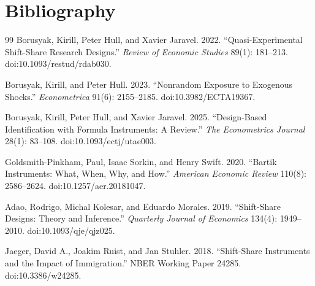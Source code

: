 \documentclass[11pt]{article}
\theoremstyle{definition}
\theoremstyle{plain}
\theoremstyle{remark}
\begin{document}
\section*{Bibliography}
\begin{thebibliography}{99}
Borusyak, Kirill, Peter Hull, and Xavier Jaravel. 2022.
``Quasi-Experimental Shift-Share Research Designs.''
\emph{Review of Economic Studies} 89(1): 181--213.
doi:10.1093/restud/rdab030.

Borusyak, Kirill, and Peter Hull. 2023.
``Nonrandom Exposure to Exogenous Shocks.''
\emph{Econometrica} 91(6): 2155--2185.
doi:10.3982/ECTA19367.

Borusyak, Kirill, Peter Hull, and Xavier Jaravel. 2025.
``Design-Based Identification with Formula Instruments: A Review.''
\emph{The Econometrics Journal} 28(1): 83--108.
doi:10.1093/ectj/utae003.

Goldsmith-Pinkham, Paul, Isaac Sorkin, and Henry Swift. 2020.
``Bartik Instruments: What, When, Why, and How.''
\emph{American Economic Review} 110(8): 2586--2624.
doi:10.1257/aer.20181047.

Adao, Rodrigo, Michal Kolesar, and Eduardo Morales. 2019.
``Shift-Share Designs: Theory and Inference.''
\emph{Quarterly Journal of Economics} 134(4): 1949--2010.
doi:10.1093/qje/qjz025.

Jaeger, David A., Joakim Ruist, and Jan Stuhler. 2018.
``Shift-Share Instruments and the Impact of Immigration.''
NBER Working Paper 24285.
doi:10.3386/w24285.
\end{thebibliography}
\end{document}
